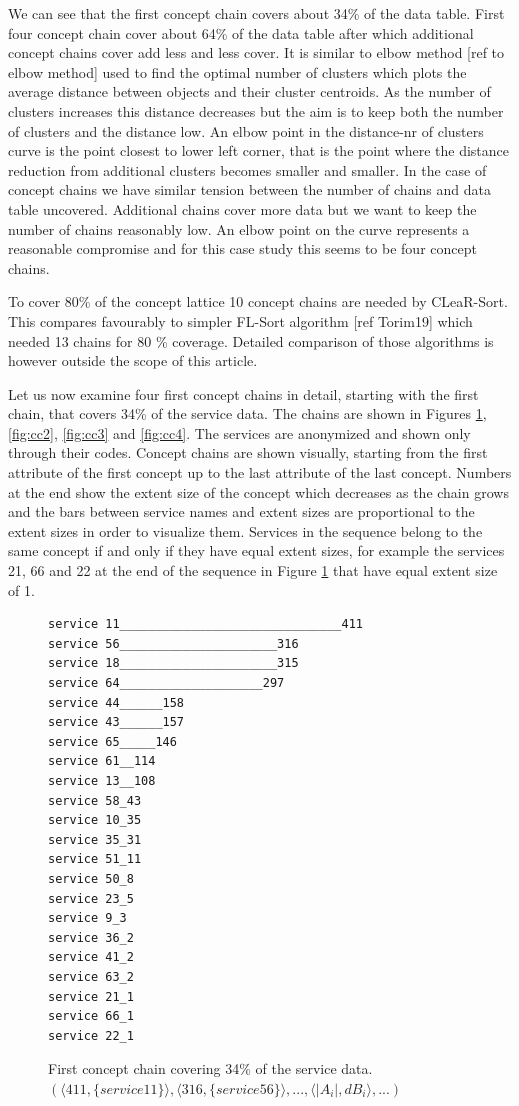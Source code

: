 \documentclass[acmconf,authordraft]{acmart}
\begin{document}
We can see that the first concept chain covers about 34\% of the data table. First four concept chain cover about 64\% of the data table after which additional concept chains cover add less and less cover. It is similar to elbow method [ref to elbow method] used to find the optimal number of clusters which plots the average distance between objects and their cluster centroids. As the number of clusters increases this distance decreases but the aim is to keep both the number of clusters and the distance low. An elbow point in the distance-nr of clusters curve is the point closest to lower left corner, that is the point where the distance reduction from additional clusters becomes smaller and smaller. In the case of concept chains we have similar tension between the number of chains and data table uncovered. Additional chains cover more data but we want to keep the number of chains reasonably low. An elbow point on the curve represents a reasonable compromise and for this case study this seems to be four concept chains.

To cover 80\% of the concept lattice 10 concept chains are needed by CLeaR-Sort. This compares favourably to simpler FL-Sort algorithm [ref Torim19] which needed 13 chains for 80 \% coverage. Detailed comparison of those algorithms is however outside the scope of this article.

Let us now examine four first concept chains in detail, starting with the first chain, that covers 34\% of the service data. The chains are shown in Figures \ref{fig:cc1}, \ref{fig:cc2}, \ref{fig:cc3} and \ref{fig:cc4}. The services are anonymized and shown only through their codes. Concept chains are shown visually, starting from the first attribute of the first concept up to the last attribute of the last concept. Numbers at the end show the extent size of the concept which decreases as the chain grows and the bars between service names and extent sizes are proportional to the extent sizes in order to visualize them. Services in the sequence belong to the same concept if and only if they have equal extent sizes, for example the  services 21, 66 and 22 at the end of the sequence in Figure \ref{fig:cc1} that have equal extent size of 1.

\begin{figure}[!htb]
\vspace{.5cm}
\begin{verbatim}
service 11_______________________________411
service 56______________________316
service 18______________________315
service 64____________________297
service 44______158
service 43______157
service 65_____146
service 61__114
service 13__108
service 58_43
service 10_35
service 35_31
service 51_11
service 50_8
service 23_5
service 9_3
service 36_2
service 41_2
service 63_2
service 21_1
service 66_1
service 22_1
\end{verbatim}

\caption{First concept chain covering 34\% of the service data. $(\langle 411, \{service 11\} \rangle,\langle 316, \{service 56\} \rangle,  ..., \langle |A_i|, dB_i \rangle, ...)$}
\label{fig:cc1}
\end{figure}
\end{document}
